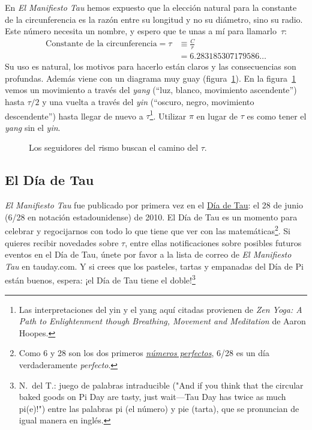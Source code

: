 En \emph{El Manifiesto Tau} hemos expuesto que la elección natural para la constante de la circunferencia es la razón entre su longitud y no su diámetro, sino su radio. Este número necesita un nombre, y espero que te unas a mí para llamarlo~$\tau$:
\[
\begin{split}
\mbox{Constante de la circunferencia} = \tau & \equiv \frac{C}{r} \\
                                             & = 6.283185307179586\ldots
\end{split}
\]
Su uso es natural, los motivos para hacerlo están claros y las consecuencias son profundas. Además viene con un diagrama muy guay (figura~\ref{fig:tauism}). En la figura~\ref{fig:tauism} vemos un movimiento a través del \emph{yang} (``luz, blanco, movimiento ascendente'') hasta $\tau/2$ y una vuelta a través del \emph{yin} (``oscuro, negro, movimiento descendente'') hasta llegar de nuevo a $\tau$\footnote{Las interpretaciones del yin y el yang aquí citadas provienen de \emph{Zen Yoga: A Path to Enlightenment though Breathing, Movement and Meditation} de Aaron Hoopes.}. Utilizar $\pi$ en lugar de $\tau$ es como tener el \emph{yang} sin el \emph{yin}.

\begin{figure}
\begin{center}
\end{center}
\caption{Los seguidores del $\tau$ismo buscan el camino del $\tau$.\label{fig:tauism}}
\end{figure}



  \subsection{El Día de Tau} %
  \label{sec:tau_day}

\emph{El Manifiesto Tau} fue publicado por primera vez en el \href{http://tauday.com/}{Día de Tau}: el 28 de junio (6/28 en notación estadounidense) de 2010. El Día de Tau es un momento para celebrar y regocijarnos con todo lo que tiene que ver con las matemáticas\footnote{Como 6 y 28 son los dos primeros \href{https://es.wikipedia.org/wiki/Número_perfecto}{\emph{números perfectos}}, 6/28 es un día verdaderamente \emph{perfecto}.}. Si quieres recibir novedades sobre $\tau$, entre ellas notificaciones sobre posibles futuros eventos en el Día de Tau, únete por favor a la lista de correo de \emph{El Manifiesto Tau} en tauday.com. Y si crees que los pasteles, tartas y empanadas del Día de Pi están buenos, espera: ¡el Día de Tau tiene el doble!\footnote{N.~del T.: juego de palabras intraducible ("And if you think that the circular baked goods on Pi Day are tasty, just wait—Tau Day has twice as much pi(e)!") entre las palabras pi (el número) y pie (tarta), que se pronuncian de igual manera en inglés.}


